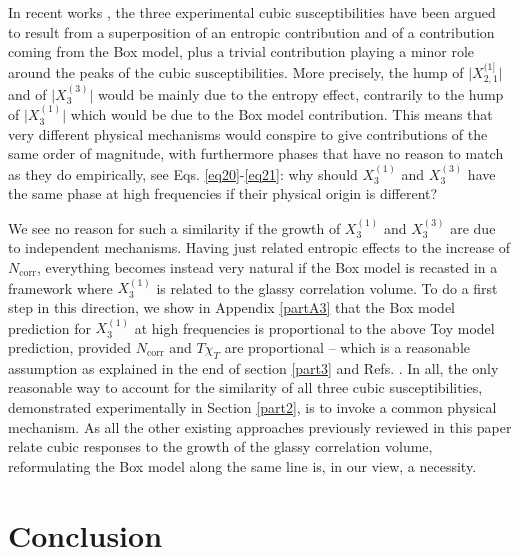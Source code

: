 \documentclass[single column,pre]{revtex4}
\begin{document}
In recent works \cite{Ric16a,Ric16b}, the three experimental cubic susceptibilities have been argued to result from  a superposition of an entropic contribution and of a contribution coming from the Box model, plus a trivial contribution playing a minor role around the peaks of the cubic susceptibilities. More precisely, the hump of
$\vert X_{2,1}^{(1]} \vert$ and of $\vert X_3^{(3)} \vert$ would be mainly due to the entropy effect, contrarily to the hump of $\vert X_{3}^{(1)} \vert$ which would be due to the Box 
 model contribution. This means that very different physical mechanisms would conspire to give contributions of the same order of magnitude, with furthermore phases that have no reason to match as they do empirically, see Eqs. \ref{eq20}-\ref{eq21}: why should $X_3^{(1)}$ and $X_3^{(3)}$ have the same phase at high frequencies if their physical origin is different?
  
We see no reason for such a similarity if the growth of $X_3^{(1)}$ and $X_3^{(3)}$ are due to independent mechanisms. Having just related entropic effects to the increase of 
$N_{\text{corr}}$, everything becomes instead very natural if the Box model is recasted in a framework where $X_3^{(1)}$ is related to the glassy correlation volume. To do a first step in this direction, we show in Appendix \ref{partA3} that the Box model prediction for $X_{3}^{(1)}$ at high frequencies is proportional to the above Toy model prediction, 
 provided  $N_{\text{corr}}$ and $T \chi_T$ are proportional -- which is a reasonable assumption as explained in the end of section \ref{part3} and Refs. \cite{Bru11,Ber05,Dal07}.  In all, the only reasonable way to account for the similarity of all three cubic susceptibilities, demonstrated experimentally in Section \ref{part2}, is to invoke a 
common physical mechanism. As all the other existing approaches previously reviewed in this paper relate cubic responses to the growth of the glassy correlation volume, reformulating the Box model along the same line is, in our view, a necessity. 

\section{\label{part5}Conclusion}
\end{document}
